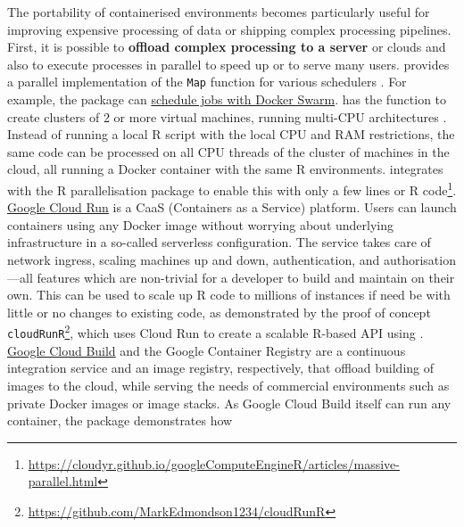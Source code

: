 The portability of containerised environments becomes particularly
useful for improving expensive processing of data or shipping complex
processing pipelines. First, it is possible to \textbf{offload complex
processing to a server} or clouds and also to execute processes in
parallel to speed up or to serve many users.
\textbf{} provides a parallel implementation of the
\texttt{Map} function for various schedulers \citep{Lang2017batchtools}.
For example, the package can
\href{https://mllg.github.io/batchtools/reference/makeClusterFunctionsDocker.html}{schedule
jobs with Docker Swarm}. \textbf{} has the
function  to create clusters of 2 or more
virtual machines, running multi-CPU architectures
\citep{googleComputeEngineR_2019}. Instead of running a local R script
with the local CPU and RAM restrictions, the same code can be processed
on all CPU threads of the cluster of machines in the cloud, all running
a Docker container with the same R environments.
 integrates with the R parallelisation package
 \citep{cran_future} to enable this with only a few
lines or R
code\footnote{\href{https://cloudyr.github.io/googleComputeEngineR/articles/massive-parallel.html}{https://cloudyr.github.io/googleComputeEngineR/articles/massive-parallel.html}}.
\href{https://cloud.run}{Google Cloud Run} is a CaaS (Containers as a
Service) platform. Users can launch containers using any Docker image
without worrying about underlying infrastructure in a so-called
serverless configuration. The service takes care of network ingress,
scaling machines up and down, authentication, and authorisation---all
features which are non-trivial for a developer to build and maintain on
their own. This can be used to scale up R code to millions of instances
if need be with little or no changes to existing code, as demonstrated
by the proof of concept
\texttt{cloudRunR}\footnote{\href{https://github.com/MarkEdmondson1234/cloudRunR}{https://github.com/MarkEdmondson1234/cloudRunR}},
which uses Cloud Run to create a scalable R-based API using
 \citep{cran_plumber}.
\href{https://cloud.google.com/cloud-build/}{Google Cloud Build} and the
Google Container Registry are a continuous integration service and an
image registry, respectively, that offload building of images to the
cloud, while serving the needs of commercial environments such as
private Docker images or image stacks. As Google Cloud Build itself can
run any container, the package  demonstrates how
